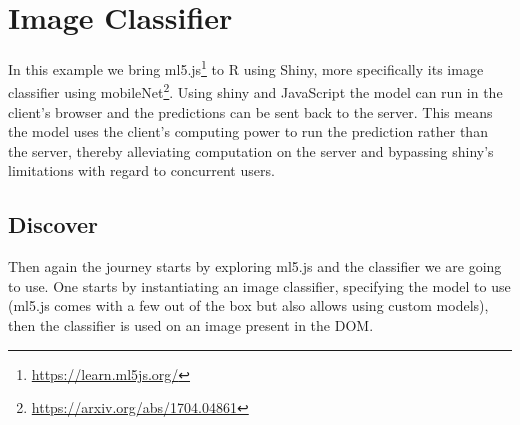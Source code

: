 \documentclass[
]{krantz}
\renewcommand{\href}[2]{#2\footnote{\url{#1}}}
\begin{document}
\hypertarget{v8-img}{%
\chapter{Image Classifier}\label{v8-img}}

In this example we bring \href{https://learn.ml5js.org/}{ml5.js} to R using Shiny, more specifically its image classifier using \href{https://arxiv.org/abs/1704.04861}{mobileNet}. Using shiny and JavaScript the model can run in the client's browser and the predictions can be sent back to the server. This means the model uses the client's computing power to run the prediction rather than the server, thereby alleviating computation on the server and bypassing shiny's limitations with regard to concurrent users.

\hypertarget{v8-img-discover}{%
\section{Discover}\label{v8-img-discover}}

Then again the journey starts by exploring ml5.js and the classifier we are going to use. One starts by instantiating an image classifier, specifying the model to use (ml5.js comes with a few out of the box but also allows using custom models), then the classifier is used on an image present in the DOM.
\end{document}
